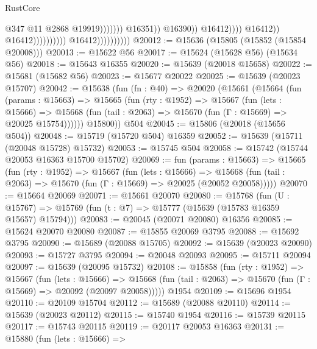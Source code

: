 \begin{lexlean}{RustCore}
\begin{coremodule}
                                                                              @347
                                                                              @11
                                                                              @2868
                                                                              @19919)))))))
                                                                @16351))
                                                            @16390))
                                                        @16412))))
                                                @16412))
                                            @16412))))))))))
                        @16412))))))))))
@20012 := @15636 (@15805 (@15852 (@15854 @20008)))
@20013 := @15622 @56
@20017 := @15624 (@15628 @56) (@15634 @56)
@20018 := @15643 @16355
@20020 := @15639 (@20018 @15658)
@20022 := @15681 (@15682 @56)
@20023 := @15677 @20022
@20025 := @15639 (@20023 @15707)
@20042 := @15638
    (fun (fn : @40) =>
    @20020
      (@15661
        (@15664
          (fun (params : @15663) =>
          @15665
            (fun (rty : @1952) =>
            @15667
              (fun (lets : @15666) =>
              @15668 (fun (tail : @2063) => @15670 (fun (Γ : @15669) => @20025 @15754))))))
        @15800))
    @504
@20045 := @15806 (@20018 (@15656 @504))
@20048 := @15719 (@15720 @504) @16359
@20052 := @15639 (@15711 (@20048 @15728) @15732)
@20053 := @15745 @504
@20058 := @15742 (@15744 @20053 @16363 @15700 @15702)
@20069 := fun (params : @15663) =>
  @15665
    (fun (rty : @1952) =>
    @15667
      (fun (lets : @15666) =>
      @15668 (fun (tail : @2063) => @15670 (fun (Γ : @15669) => @20025 (@20052 @20058)))))
@20070 := @15664 @20069
@20071 := @15661 @20070
@20080 := @15768
    (fun (U : @15767) => @15769 (fun (t : @7) => @15777 (@15639 (@15783 @16359 @15657) @15794)))
@20083 := @20045 (@20071 @20080) @16356
@20085 := @15624 @20070 @20080
@20087 := @15855 @20069 @3795
@20088 := @15692 @3795
@20090 := @15689 (@20088 @15705)
@20092 := @15639 (@20023 @20090)
@20093 := @15727 @3795
@20094 := @20048 @20093
@20095 := @15711 @20094
@20097 := @15639 (@20095 @15732)
@20108 := @15858
    (fun (rty : @1952) =>
    @15667
      (fun (lets : @15666) =>
      @15668 (fun (tail : @2063) => @15670 (fun (Γ : @15669) => @20092 (@20097 @20058)))))
    @1954
@20109 := @15696 @1954
@20110 := @20109 @15704
@20112 := @15689 (@20088 @20110)
@20114 := @15639 (@20023 @20112)
@20115 := @15740 @1954
@20116 := @15739 @20115
@20117 := @15743 @20115
@20119 := @20117 @20053 @16363
@20131 := @15880
    (fun (lets : @15666) =>

\end{coremodule}
\end{lexlean}

